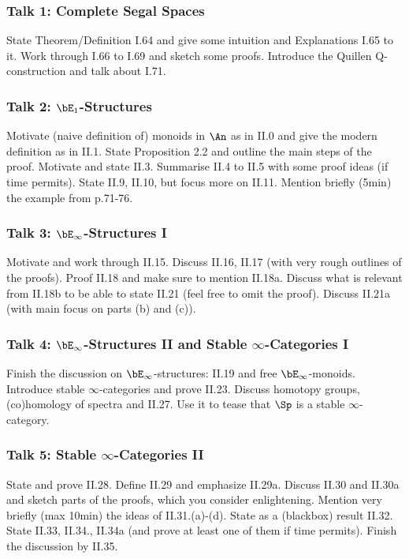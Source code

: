\documentclass{article}
\begin{document}
\subsubsection*{Talk 1: Complete Segal Spaces}
State Theorem/Definition I.64 and give some intuition and
Explanations I.65 to it.
Work through I.66 to I.69 and sketch some proofs.
Introduce the Quillen Q-construction and talk about I.71.

\subsubsection*{Talk 2: $\bE_1$-Structures}
Motivate (naive definition of) monoids in $\An$ as in II.0 and
give the modern definition as in II.1. State Proposition 2.2 and 
outline the main steps of the proof.
Motivate and state II.3. Summarise II.4 to II.5 with some proof ideas
(if time permits). State II.9, II.10, but focus more on II.11.
Mention briefly (5min) the example from p.71-76.


\subsubsection*{Talk 3: $\bE_\infty$-Structures I}
Motivate and work through II.15. Discuss II.16, II.17 (with very rough outlines
of the proofs). Proof II.18 and make sure to mention II.18a.
Discuss what is relevant from II.18b to be able to state II.21
(feel free to omit the proof). Discuss II.21a (with main focus on parts 
(b) and (c)).

\subsubsection*{Talk 4: $\bE_\infty$-Structures II and 
Stable $\infty$-Categories I}
Finish the discussion on $\bE_\infty$-structures: II.19 and free 
$\bE_\infty$-monoids.
Introduce stable $\infty$-categories and prove II.23. Discuss
homotopy groups, (co)homology of spectra and II.27. Use it to 
tease that $\Sp$ is a stable $\infty$-category.

\subsubsection*{Talk 5: Stable $\infty$-Categories II}
State and prove II.28. Define II.29 and emphasize II.29a.
Discuss II.30 and II.30a and sketch parts of the proofs, which you consider
enlightening. Mention very briefly (max 10min) the ideas of II.31.(a)-(d).
State as a (blackbox) result II.32. State II.33, II.34., II.34a 
(and prove at least one of them if time permits).
Finish the discussion by II.35.
\end{document}
